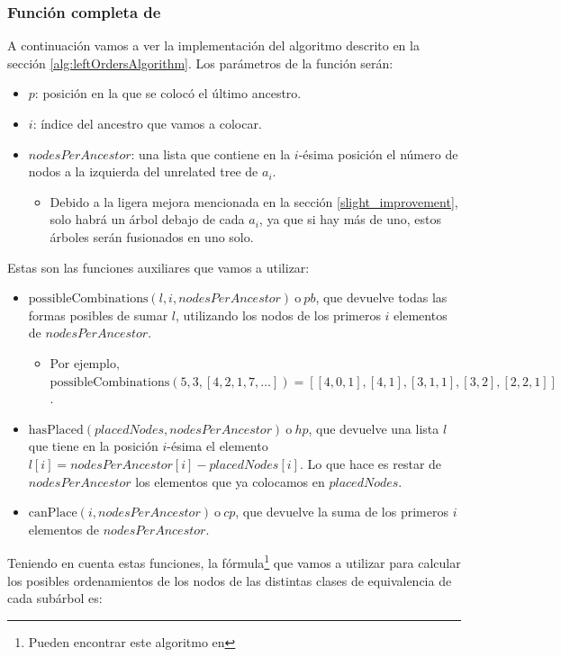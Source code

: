 \subsubsection{Función completa de \leftPossibleOrders} \label{subsubSection:leftOrdersImplementation}

A continuación vamos a ver la implementación del algoritmo descrito en la sección \ref{alg:leftOrdersAlgorithm}. Los parámetros de la función serán:
\begin{itemize}
    \item $p$: posición en la que se colocó el último ancestro.
    \item $i$: índice del ancestro que vamos a colocar.
    \item $nodesPerAncestor$: una lista que contiene en la  $i$-ésima posición el número de nodos a la izquierda del unrelated tree de $a_i$.
        \begin{itemize}
            \item Debido a la ligera mejora mencionada en la sección \ref{slight_improvement}, solo habrá un árbol debajo de cada $a_i$, ya que si hay más de uno, estos árboles serán fusionados en uno solo. 
        \end{itemize}
\end{itemize}

Estas son las funciones auxiliares que vamos a utilizar:
\begin{itemize}
    \item $\mathrm{possibleCombinations}(l,i,nodesPerAncestor) \ \text{o} \ pb$, que devuelve todas las formas posibles de sumar $l$, utilizando los nodos de los primeros $i$ elementos de $nodesPerAncestor$.
        \begin{itemize}
            \item Por ejemplo, $\mathrm{possibleCombinations}(5,3,[4,2,1,7,\dots])= [[4,0,1], [4,1], [3,1,1], [3,2], [2,2,1]]$.
        \end{itemize}
    \item $\mathrm{hasPlaced}(placedNodes, nodesPerAncestor) \ \text{o} \ hp$, que devuelve una lista $l$ que tiene en la posición $i$-ésima el elemento $l[i]= nodesPerAncestor[i] - placedNodes[i]$. Lo que hace es restar de $nodesPerAncestor$ los elementos que ya colocamos en $placedNodes$.
    \item $\mathrm{canPlace}(i ,nodesPerAncestor) \ \text{o} \ cp$, que devuelve la suma de los primeros $i$ elementos de $nodesPerAncestor$.
\end{itemize}
Teniendo en cuenta estas funciones, la fórmula\footnote{Pueden encontrar este algoritmo en } que vamos a utilizar para calcular los posibles ordenamientos de los nodos de las distintas clases de equivalencia de cada subárbol es:

